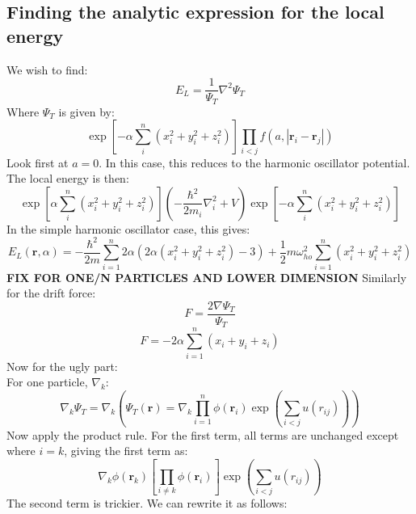 \documentclass[a4paper, 10pt]{article}
\begin{document}
\begin{appendices}
\section{Finding the analytic expression for the local energy}
We wish to find:
\begin{equation}
E_L=\frac{1}{\Psi_T}\nabla^2 \Psi_T
\end{equation}
Where $\Psi_T$ is given by:
\begin{equation}
\exp\left[ -\alpha \sum_{i}^n\left(x_i^2+y_i^2+z_i^2\right)\right]\prod_{i<j}f(a, |\mathbf{r}_i-\mathbf{r}_j|)
\end{equation}
Look first at $a=0$. In this case, this reduces to the harmonic oscillator potential. The local energy is then:
\begin{equation}
\exp\left[ \alpha \sum_{i}^n\left(x_i^2+y_i^2+z_i^2\right)\right]\left(-\frac{\hbar^2}{2m_i}\nabla_i^2+V\right)\exp\left[ -\alpha \sum_{i}^n\left(x_i^2+y_i^2+z_i^2\right)\right]
\end{equation}
In the simple harmonic oscillator case, this gives:
\begin{equation}
E_L(\mathbf{r},\alpha)=-\frac{\hbar^2}{2m}\sum_{i=1}^n 2\alpha \left(2\alpha(x_i^2+y_i^2+z_i^2)-3\right)+\frac{1}{2}m\omega_{ho}^2\sum_{i=1}^n(x_i^2+y_i^2+z_i^2)
\end{equation}
\textbf{FIX FOR ONE/N PARTICLES AND LOWER DIMENSION}
Similarly for the drift force:
\begin{equation}
F=\frac{2\nabla \Psi_T}{\Psi_T}
\end{equation}
\begin{equation}
F=-2\alpha\sum_{i=1}^n(x_i+y_i+z_i)
\end{equation}
Now for the ugly part:\\
For one particle, $\nabla_k$:
\begin{equation}
\nabla_k\Psi_{T} = \nabla_k\left(\Psi_T(\mathbf{r})=\nabla_k \prod_{i=1}^n\phi(\mathbf{r}_i)\exp\left(\sum_{i<j} u(r_{ij})\right)\right)
\end{equation}
Now apply the product rule. For the first term, all terms are unchanged except where $i=k$, giving the first term as:
\begin{equation}
\nabla_k \phi(\mathbf{r}_k)\left[ \prod_{i\neq k} \phi(\mathbf{r}_i)\right]\exp\left(\sum_{i<j}u(r_{ij})\right)
\end{equation}
The second term is trickier. We can rewrite it as follows:
\begin{align}

\end{align}
\end{appendices}
\end{document}
